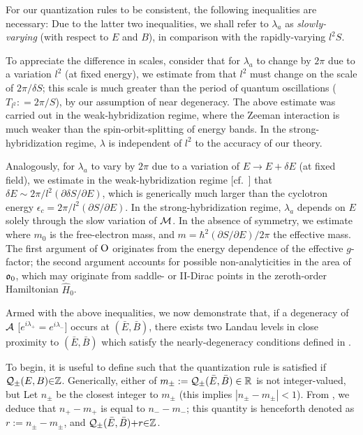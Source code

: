 \documentclass[aps, showpacs, twocolumn, notitlepage, superscriptaddress]{revtex4-1}
\begin{document}
For our quantization rules to be consistent, the following inequalities are necessary:
Due to the latter two inequalities, we shall refer to $\lambda_{a}$ as \textit{slowly-varying} (with respect to $E$ and $B$), in comparison with the rapidly-varying $l^2S$. 

To appreciate the difference in scales, consider that for $\lambda_a$ to change by $2\pi$ due to a variation $l^2$ (at fixed energy), we estimate from  that $l^2$ must change on the scale of $2\pi/\delta S$; this scale is much greater than the period of quantum oscillations ($T_{l^2}{:}{=}2\pi/S$), by our assumption of near degeneracy. The above estimate was carried out in the weak-hybridization regime, where the Zeeman interaction is much weaker than the spin-orbit-splitting of energy bands. In the strong-hybridization regime, $\lambda$ is independent of $l^2$ to the accuracy of our theory.

Analogously, for $\lambda_a$ to vary by $2\pi$ due to a variation of $E\rightarrow E+\delta E$ (at fixed field), we estimate in the weak-hybridization regime [cf.\ ] that $\delta E {\sim} 2\pi/l^2 (\partial \delta S/\partial E)$, which is generically much larger than the cyclotron energy $\epsilon_c{=}2\pi/l^2 (\partial  S/\partial E)$. In the strong-hybridization regime, $\lambda_a$ depends on $E$ solely through the slow variation of ${\cal M}$.  In the absence of symmetry, we estimate 
where $m_0$ is the free-electron mass, and $m{=}\hbar^2(\partial S/\partial E)/2\pi$ the effective mass. The first argument of $\text{O}$ originates from the energy dependence of the effective $g$-factor; the second argument accounts for possible non-analyticities in the area of $\mathfrak{o}_0$, which may originate from saddle- or II-Dirac points in the zeroth-order Hamiltonian $\hat{H}_0$.

Armed with the above inequalities, we now demonstrate that, if a degeneracy of ${\cal A}$ [$e^{i\lambda_+}{=}e^{i\lambda_-}$] occurs at $(\bar{E},\bar{B})$, there exists two Landau levels in close proximity to $(\bar{E},\bar{B})$ which satisfy the nearly-degeneracy conditions defined in .

To begin, it is useful to define
such that the quantization rule  is satisfied if ${\cal Q}_{\pm}(E,B){\in}\mathbb{Z}$. 
Generically, either of $m_{\pm}:={\cal Q}_{\pm}(\bar{E},\bar{B})\in \mathbb{R}$ is not integer-valued, but 
Let $n_{\pm}$ be the closest integer to $m_{\pm}$ (this implies $|n_{\pm}-m_{\pm}|<1$).  From , we deduce that $n_+-m_+$ is equal to $n_--m_-$; this quantity is henceforth denoted as $r:= n_{\pm}-m_{\pm}$, and  ${\cal Q}_{\pm}(\bar{E},\bar{B}){+}r{\in} \mathbb{Z}$. 
\end{document}

